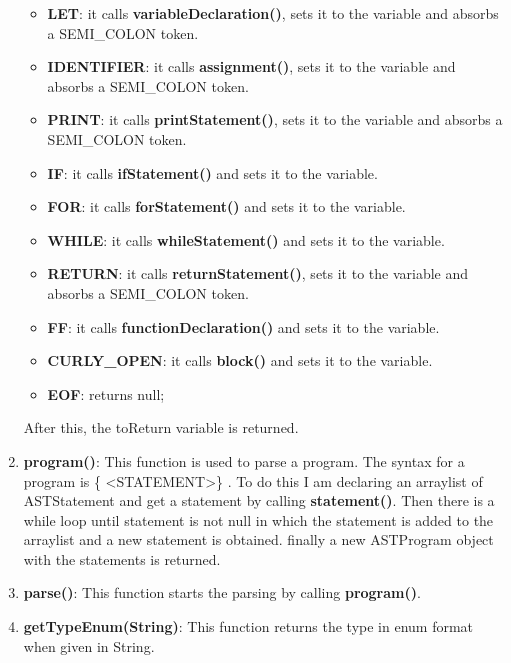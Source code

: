 \documentclass{article}
\begin{document}
\begin{enumerate}
				\begin{itemize}
				\item \textbf{LET}: it calls \textbf{variableDeclaration()}, sets it to the variable and absorbs a SEMI\_COLON token.
				\item \textbf{IDENTIFIER}: it calls \textbf{assignment()}, sets it to the variable and absorbs a SEMI\_COLON token.
				\item \textbf{PRINT}: it calls \textbf{printStatement()}, sets it to the variable and absorbs a SEMI\_COLON token.
				\item \textbf{IF}: it calls \textbf{ifStatement()} and sets it to the variable.	
				\item \textbf{FOR}: it calls \textbf{forStatement()} and sets it to the variable.	
				\item \textbf{WHILE}: it calls \textbf{whileStatement()} and sets it to the variable.	
				\item \textbf{RETURN}: it calls \textbf{returnStatement()}, sets it to the variable and absorbs a SEMI\_COLON token.
				\item \textbf{FF}: it calls \textbf{functionDeclaration()} and sets it to the variable.	
				\item \textbf{CURLY\_OPEN}: it calls \textbf{block()} and sets it to the variable.	
				\item \textbf{EOF}: returns null;	
					\end{itemize}
					
				After this, the toReturn variable is returned.
				
				\item \textbf{program()}: This function is used to parse a program. The syntax for a program is  \{ \textless STATEMENT\textgreater \} . To do this I am declaring an arraylist of ASTStatement and get a statement by calling \textbf{statement()}. Then there is a while loop until statement is not null in which the statement is added to the arraylist and a new statement is obtained. finally a new ASTProgram object with the statements is returned.
				
				\item \textbf{parse()}: This function starts the parsing by calling \textbf{program()}.
				
				\item \textbf{getTypeEnum(String)}: This function returns the type in enum format when given in String.
				
				
					
								
				\end{enumerate}
				
\end{document}
